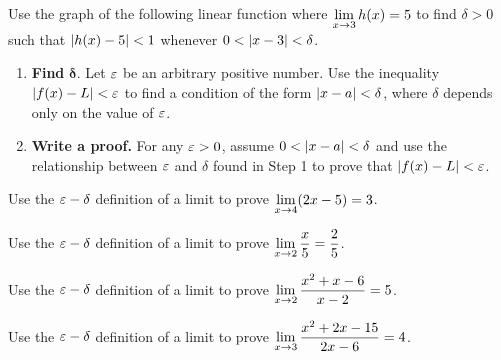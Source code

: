 \documentclass[../mathNotesPreamble]{subfiles}
\begin{document}
\begin{ex*}
  Use the graph of the following linear function where $\displaystyle\lim_{x \to 3} h(x)=5$ to find $\delta>0$ such that ${\left\vert h(x)-5\right\vert}<1$ whenever $0<{\left\vert x-3\right\vert}<\delta$.
  \begin{flushright}
  \end{flushright}
\end{ex*}
\pagebreak

\begin{thmBox*}[Steps for proving that $\ds\lim_{x \to a} f(x)=L$]
  \begin{enumerate}
    \item \textbf{Find }$\bm \delta.$ Let $\varepsilon$ be an arbitrary positive number. Use the inequality ${\left\vert f(x)-L\right\vert}<\varepsilon$ to find a condition of the form ${\left\vert x-a\right\vert}<\delta$, where $\delta$ depends only on the value of $\varepsilon$.
    \item \textbf{Write a proof.} For any $\varepsilon>0$, assume $0<{\left\vert x-a\right\vert}<\delta$ and use the relationship between $\varepsilon$ and $\delta$ found in Step 1 to prove that ${\left\vert f(x)-L\right\vert}<\varepsilon$.
  \end{enumerate}
\end{thmBox*}
  
  \begin{ex*}
    Use the $\varepsilon-\delta$ definition of a limit to prove $\displaystyle\lim_{x \to 4}(2x-5)=3$.
  \end{ex*}
  \begin{ex*}
    Use the $\varepsilon-\delta$ definition of a limit to prove $\displaystyle\lim_{x \to 2}\dfrac{x}{5}=\dfrac{2}{5}$.
  \end{ex*}
  \pagebreak
  \begin{ex*}
    Use the $\varepsilon-\delta$ definition of a limit to prove $\displaystyle\lim_{x \to 2}\dfrac{x^2+x-6}{x-2}=5$.
  \end{ex*}
  \begin{ex*}
    Use the $\varepsilon-\delta$ definition of a limit to prove $\displaystyle\lim_{x \to 3}\dfrac{x^2+2x-15}{2x-6}=4$.
  \end{ex*}
  \pagebreak
\end{document}

